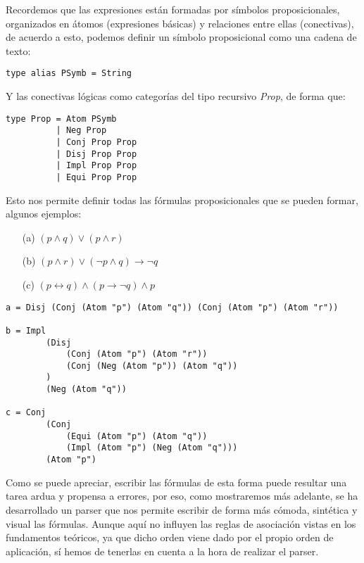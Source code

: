 \documentclass[a4paper]{report}
\begin{document}
Recordemos que las expresiones están formadas por símbolos proposicionales, organizados en átomos (expresiones básicas) y relaciones entre ellas (conectivas), de acuerdo a esto, podemos definir un símbolo proposicional como una cadena de texto:\\

\begin{lstlisting}[caption= Definición de Símbolo Proposicional como alias de String.]
type alias PSymb = String 
\end{lstlisting}

Y las conectivas lógicas como categorías del tipo recursivo \textit{Prop}, de forma que:\\

\begin{lstlisting}[caption= Definición del tipo Prop (Proposición).]
type Prop = Atom PSymb
          | Neg Prop
          | Conj Prop Prop
          | Disj Prop Prop
          | Impl Prop Prop
          | Equi Prop Prop
\end{lstlisting}

Esto nos permite definir todas las fórmulas proposicionales que se pueden formar, algunos ejemplos: \\

\begin{multicols}{3}
\begin{itemize}
\item[(a)] $ (p \wedge q) \vee (p \wedge r)$
\item[(b)] $ (p \wedge r) \vee (\neg p \wedge q) \rightarrow \neg q$
\item[(c)] $(p \leftrightarrow q) \wedge (p \rightarrow \neg q) \wedge p$
\end{itemize}
\end{multicols}

\begin{lstlisting}[caption= Ejemplos de definición de fórmulas proposicionales.]
a = Disj (Conj (Atom "p") (Atom "q")) (Conj (Atom "p") (Atom "r"))
    
b = Impl 
        (Disj 
            (Conj (Atom "p") (Atom "r")) 
            (Conj (Neg (Atom "p")) (Atom "q"))
        ) 
        (Neg (Atom "q"))

c = Conj 
        (Conj 
            (Equi (Atom "p") (Atom "q")) 
            (Impl (Atom "p") (Neg (Atom "q"))) 
        (Atom "p")
\end{lstlisting}

Como se puede apreciar, escribir las fórmulas de esta forma puede resultar una tarea ardua y propensa a errores, por eso, como mostraremos más adelante, se ha desarrollado un parser que nos permite escribir de forma más cómoda, sintética y visual las fórmulas. Aunque aquí no influyen las reglas de asociación vistas en los fundamentos teóricos, ya que dicho orden viene dado por el propio orden de aplicación, sí hemos de tenerlas en cuenta a la hora de realizar el parser. 
\end{document}
